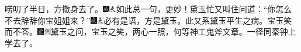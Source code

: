 唠叨了半日，方撤身去了。{\includegraphics[width=3mm]{../Images/00005}\includegraphics[width=3mm]{../Images/00012}\footnotesize \kaishu 如此总一句，更妙！}黛玉忙又叫住问道：``你怎么不去辞辞你宝姐姐来？''{\includegraphics[width=3mm]{../Images/00005}\includegraphics[width=3mm]{../Images/00012}\footnotesize \kaishu 必有是语，方是黛玉。此又系黛玉平生之病。}宝玉笑而不答。{\includegraphics[width=3mm]{../Images/00006}\includegraphics[width=3mm]{../Images/00011}\footnotesize \kaishu 黛玉之问，宝玉之笑，两心一照，何等神工鬼斧文章。}一径同秦钟上学去了。

